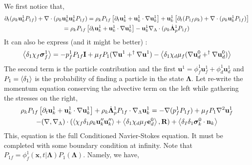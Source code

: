 \documentclass[11pt]{My_preprint}
\begin{document}
We first notice that, 
\begin{multline}
    \partial_t (\rho_k \textbf{u}_k^1 P_{1f})
    + \mathbf{\nabla}\cdot (
         \rho_k \textbf{u}_k^1 \textbf{u}_k^1 P_{1f})
    = \rho_k P_{1f} \left[\partial_t \textbf{u}_k^1 
        +\textbf{u}_k^1 \cdot \mathbf{\nabla} \textbf{u}_k^1 
    \right]
    + \textbf{u}_k^1 \left[
        \partial_t (P_{1f}\rho_k)
        +\mathbf{\nabla}\cdot(\rho_k \textbf{u}_k^1 P_{1f})
    \right]\\
    = \rho_k P_{1f} \left[\partial_t \textbf{u}_k^1 
        +\textbf{u}_k^1 \cdot \mathbf{\nabla} \textbf{u}_k^1 
    \right]
    - \textbf{u}_k^1 
        \mathbf{\nabla}_\Lambda \cdot ( \rho_k \dot{\bm\Lambda}_p^1 P_{1f})
    \\
\end{multline}
It can also be express (and it might be better) : 
\begin{multline}
    \left<\delta_1 \chi_f \bm\sigma_f^1\right>
    = 
    - p_f^1 P_{1f} \textbf{I}
    + \mu_f P_1 (\mathbf{\nabla} \textbf{u}^1 + ^\dagger \mathbf{\nabla} \textbf{u}^1)
    - \left<\delta_1\chi_d \mu_f (\mathbf{\nabla} \textbf{u}_d^0 + ^\dagger \mathbf{\nabla} \textbf{u}_d^0)\right>\\
\end{multline}
The second term is the particle contribution and the first $\textbf{u}^1  =  \phi_f^1 \textbf{u}_f^1 + \phi_d^1 \textbf{u}_d^1 $ and $P_1 = \left<\delta_1\right>$ is the probability of finding a particle in the state $\bm\Lambda$. 
Let re-write the momentum equation conserving the advective term on the left while gathering the stresses on  the right, 
\begin{multline}
    \rho_k P_{1f} \left[\partial_t \textbf{u}_k^1 
        +\textbf{u}_k^1 \cdot \mathbf{\nabla} \textbf{u}_k^1 
    \right]
    +  \rho_k \dot{\bm\Lambda}_p^1 P_{1f} \cdot \mathbf{\nabla}_\Lambda \textbf{u}_k^1 
    =  - \mathbf{\nabla} (p_f^1 P_{1f})
    + \mu_f P_1 \mathbf{\nabla}^2 \textbf{u}_f^1
    \\
    - (\mathbf{\nabla},\mathbf{\nabla}_\Lambda) \cdot (\left<\chi_f \delta_1 \rho_k \textbf{u}''_k\textbf{u}''_k\right> + \left<\delta_1 \chi_d \mu_f \textbf{e}_d^0\right>,\textbf{R})
    + \left<\delta_I\delta_1
         \bm\sigma_k^0
    \cdot \textbf{n}_k\right>\\
\end{multline}
This, equation is the full Conditioned Navier-Stokes equation. 
It must be completed with some boundary condition at infinity. 
Note that $P_{1f} = \phi_f^1(\textbf{x},t|\bm\Lambda) P_1(\bm\Lambda)$.
Namely, we have, 
\end{document}
